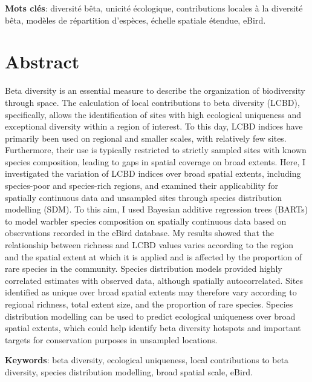 \documentclass[12pt,twoside,maitrise]{dms}
\numberwithin{equation}{section}
\numberwithin{table}{chapter}
\numberwithin{figure}{chapter}
\begin{document}
\textbf{Mots clés}: diversité bêta, unicité écologique, contributions locales à la diversité bêta, modèles de répartition d'espèces, échelle spatiale étendue, eBird.


\anglais
\chapter*{Abstract}

Beta diversity is an essential measure to describe the organization of biodiversity through space. The calculation of local contributions to beta diversity (LCBD), specifically, allows the identification of sites with high ecological uniqueness and exceptional diversity within a region of interest. To this day, LCBD indices have primarily been used on regional and smaller scales, with relatively few sites. Furthermore, their use is typically restricted to strictly sampled sites with known species composition, leading to gaps in spatial coverage on broad extents. Here, I investigated the variation of LCBD indices over broad spatial extents, including species-poor and species-rich regions, and examined their applicability for spatially continuous data and unsampled sites through species distribution modelling (SDM). To this aim, I used Bayesian additive regression trees (BARTs) to model warbler species composition on spatially continuous data based on observations recorded in the eBird database. My results showed that the relationship between richness and LCBD values varies according to the region and the spatial extent at which it is applied and is affected by the proportion of rare species in the community. Species distribution models provided highly correlated estimates with observed data, although spatially autocorrelated. Sites identified as unique over broad spatial extents may therefore vary according to regional richness, total extent size, and the proportion of rare species. Species distribution modelling can be used to predict ecological uniqueness over broad spatial extents, which could help identify beta diversity hotspots and important targets for conservation purposes in unsampled locations.

\textbf{Keywords}: beta diversity, ecological uniqueness, local contributions to beta diversity, species distribution modelling, broad spatial scale, eBird.
\end{document}
